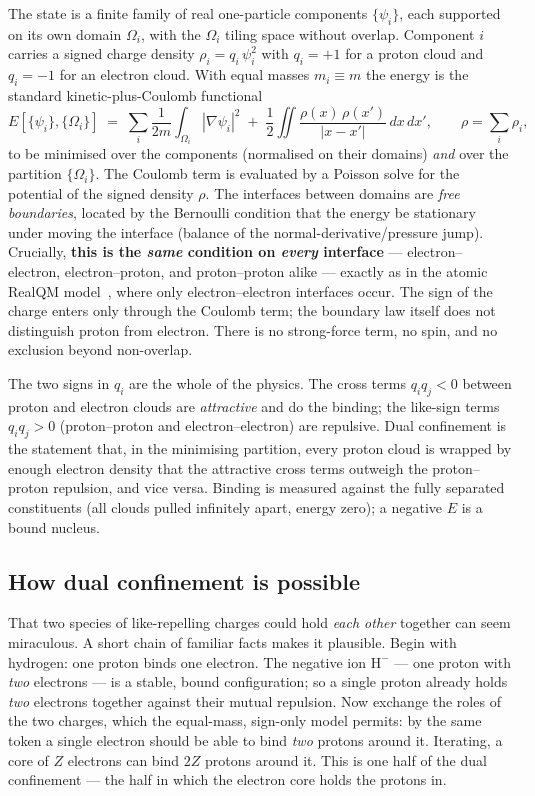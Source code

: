 \documentclass[11pt]{article}
\begin{document}
The state is a finite family of real one-particle components $\{\psi_i\}$, each supported on
its own domain $\Omega_i$, with the $\Omega_i$ tiling space without overlap. Component $i$
carries a signed charge density $\rho_i = q_i\,\psi_i^2$ with $q_i=+1$ for a proton cloud and
$q_i=-1$ for an electron cloud. With equal masses $m_i\equiv m$ the energy is the standard
kinetic-plus-Coulomb functional
\begin{equation}
E[\{\psi_i\},\{\Omega_i\}]
 \;=\; \sum_i \frac{1}{2m}\int_{\Omega_i}|\nabla\psi_i|^2
 \;+\; \frac12\iint \frac{\rho(x)\,\rho(x')}{|x-x'|}\,dx\,dx',
 \qquad \rho=\sum_i \rho_i ,
\label{eq:energy}
\end{equation}
to be minimised over the components (normalised on their domains) \emph{and} over the partition
$\{\Omega_i\}$. The Coulomb term is evaluated by a Poisson solve for the potential of the
signed density $\rho$. The interfaces between domains are \emph{free boundaries}, located by
the Bernoulli condition that the energy be stationary under moving the interface (balance of
the normal-derivative/pressure jump). Crucially, \textbf{this is the \emph{same} condition on
\emph{every} interface} --- electron--electron, electron--proton, and proton--proton alike ---
exactly as in the atomic RealQM model~\cite{Johnson-Atoms}, where only electron--electron
interfaces occur. The sign of the charge enters only through the Coulomb term; the boundary
law itself does not distinguish proton from electron. There is no strong-force term, no spin,
and no exclusion beyond non-overlap.

The two signs in $q_i$ are the whole of the physics. The cross terms $q_iq_j<0$ between proton
and electron clouds are \emph{attractive} and do the binding; the like-sign terms $q_iq_j>0$
(proton--proton and electron--electron) are repulsive. Dual confinement is the statement that,
in the minimising partition, every proton cloud is wrapped by enough electron density that the
attractive cross terms outweigh the proton--proton repulsion, and vice versa. Binding is
measured against the fully separated constituents (all clouds pulled infinitely apart, energy
zero); a negative $E$ is a bound nucleus.

\subsection{How dual confinement is possible}

That two species of like-repelling charges could hold \emph{each other} together can seem
miraculous. A short chain of familiar facts makes it plausible. Begin with hydrogen: one proton
binds one electron. The negative ion $\mathrm{H}^-$ --- one proton with \emph{two} electrons ---
is a stable, bound configuration; so a single proton already holds \emph{two} electrons together
against their mutual repulsion. Now exchange the roles of the two charges, which the equal-mass,
sign-only model permits: by the same token a single electron should be able to bind \emph{two}
protons around it. Iterating, a core of $Z$ electrons can bind $2Z$ protons around it. This is one
half of the dual confinement --- the half in which the electron core holds the protons in.
\end{document}
